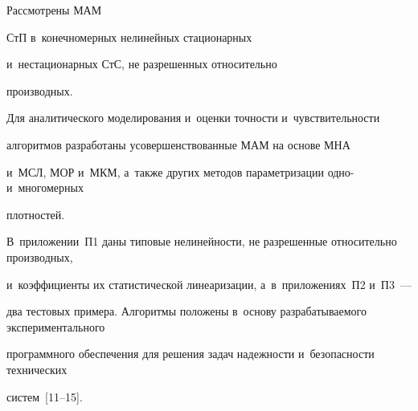 Рассмотрены МАМ 

СтП в~конечномерных нелинейных стационарных 

и~нестационарных СтС, не разрешенных относительно 

производных.



\pagebreak



Для аналитического моделирования и~оценки точности и~чувствительности 

алгоритмов разработаны усовершенствованные МАМ на основе МНА

и~МСЛ, МОР и~МКМ, а~также других методов параметризации одно- и~многомерных 

плотностей.



 В~приложении~П1 даны типовые нелинейности, не разрешенные относительно производных, 

 и~коэффициенты их статистической линеаризации, а~в~приложениях~П2 и~П3~--- 

 два тестовых примера. Алгоритмы положены в~основу разрабатываемого экспериментального 

 программного обеспечения для решения задач надежности и~без\-опас\-ности технических 

 сис\-тем~[11--15].



